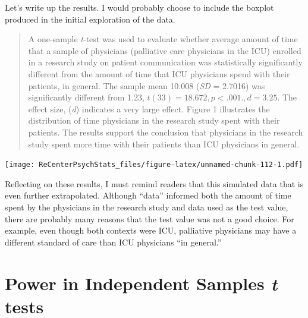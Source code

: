 \documentclass[
  11pt,
]{book}
\newenvironment{Shaded}{\begin{snugshade}}{\end{snugshade}}
\newcommand{\AttributeTok}[1]{\textcolor[rgb]{0.77,0.63,0.00}{#1}}
\newcommand{\ConstantTok}[1]{\textcolor[rgb]{0.00,0.00,0.00}{#1}}
\newcommand{\FunctionTok}[1]{\textcolor[rgb]{0.00,0.00,0.00}{#1}}
\newcommand{\NormalTok}[1]{#1}
\newcommand{\SpecialCharTok}[1]{\textcolor[rgb]{0.00,0.00,0.00}{#1}}
\newcommand{\StringTok}[1]{\textcolor[rgb]{0.31,0.60,0.02}{#1}}
\begin{document}
Let's write up the results. I would probably choose to include the boxplot produced in the initial exploration of the data.

\begin{quote}
A one-sample \emph{t}-test was used to evaluate whether average amount of time that a sample of physicians (palliative care physicians in the ICU) enrolled in a research study on patient communication was statistically significantly different from the amount of time that ICU physicians spend with their patients, in general. The sample mean 10.008 (\emph{SD} = 2.7016) was significantly different from 1.23, \(t(33) = 18.672, p < .001., d = 3.25\). The effect size, (\emph{d}) indicates a very large effect. Figure 1 illustrates the distribution of time physicians in the research study spent with their patients. The results support the conclusion that physicians in the research study spent more time with their patients than ICU physicians in general.
\end{quote}

\begin{Shaded}
\end{Shaded}

\texttt{[image: ReCenterPsychStats\_files/figure-latex/unnamed-chunk-112-1.pdf]}

Reflecting on these results, I must remind readers that this simulated data that is even further extrapolated. Although ``data'' informed both the amount of time spent by the physicians in the research study and data used as the test value, there are probably many reasons that the test value was not a good choice. For example, even though both contexts were ICU, palliative physicians may have a different standard of care than ICU physicians ``in general.''

\hypertarget{power-in-independent-samples-t-tests}{%
\section{\texorpdfstring{Power in Independent Samples \emph{t} tests}{Power in Independent Samples t tests}}\label{power-in-independent-samples-t-tests}}
\end{document}
